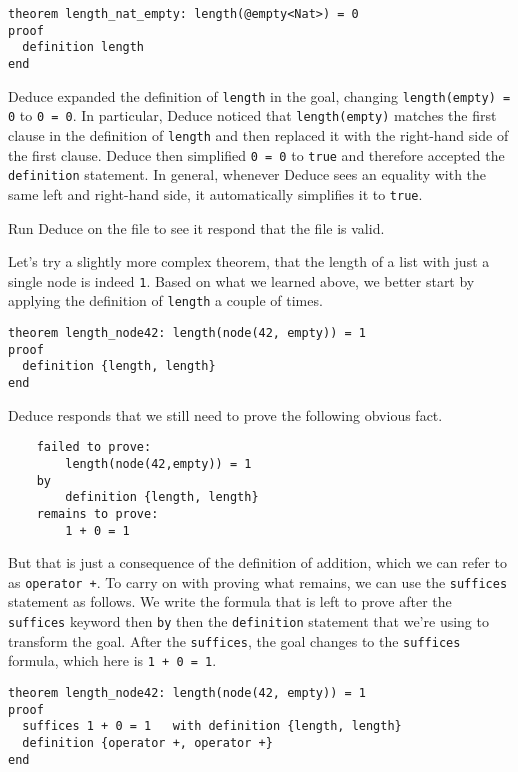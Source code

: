 \documentclass[12pt]{article}
\begin{document}
\begin{verbatim}
theorem length_nat_empty: length(@empty<Nat>) = 0
proof
  definition length
end
\end{verbatim}

\noindent Deduce expanded the definition of \texttt{length} in the
goal, changing \texttt{length(empty) = 0} to \texttt{0 = 0}. In
particular, Deduce noticed that \texttt{length(empty)} matches the
first clause in the definition of \texttt{length} and then replaced it
with the right-hand side of the first clause. Deduce then simplified
\texttt{0 = 0} to \texttt{true} and therefore accepted the
\texttt{definition} statement. In general, whenever Deduce sees an
equality with the same left and right-hand side, it automatically
simplifies it to \texttt{true}.

Run Deduce on the file to see it respond that the file is valid.

Let's try a slightly more complex theorem, that the length
of a list with just a single node is indeed \texttt{1}. Based
on what we learned above, we better start by applying the
definition of \texttt{length} a couple of times.

\begin{verbatim}
theorem length_node42: length(node(42, empty)) = 1
proof
  definition {length, length}
end
\end{verbatim}

\noindent Deduce responds that we still need to prove the following
obvious fact.

\begin{verbatim}
    failed to prove:
        length(node(42,empty)) = 1
    by
        definition {length, length}
    remains to prove:
        1 + 0 = 1
\end{verbatim}

\noindent But that is just a consequence of the definition of
addition, which we can refer to as \texttt{operator +}.  To carry on
with proving what remains, we can use the \texttt{suffices} statement
as follows. We write the formula that is left to prove after the
\texttt{suffices} keyword then \texttt{by} then the
\texttt{definition} statement that we're using to transform the goal.
After the \texttt{suffices}, the goal changes to the \texttt{suffices}
formula, which here is \texttt{1 + 0 = 1}.

\begin{verbatim}
theorem length_node42: length(node(42, empty)) = 1
proof
  suffices 1 + 0 = 1   with definition {length, length}
  definition {operator +, operator +}
end
\end{verbatim}
\end{document}
